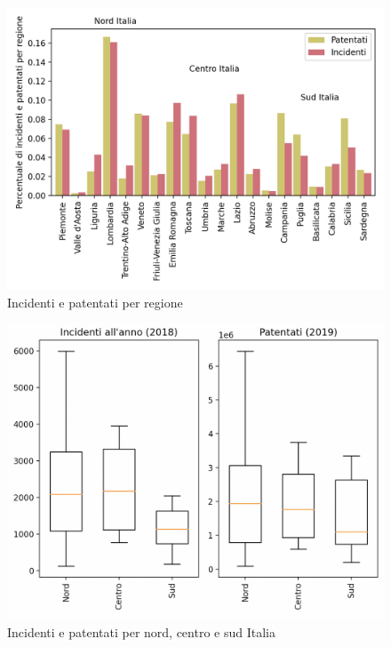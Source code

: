 \documentclass[a4paper]{report}
\begin{document}
\begin{figure}
    \includegraphics[width=\linewidth]{../src/incidenti/incidenti_aci/mappe_regioni/incidenti_patenti_bar.png}
    \caption{Incidenti e patentati per regione}
    \label{fig:incidenti-patentati-bar}
\end{figure}

\begin{figure}
    \includegraphics[width=\linewidth]{../src/incidenti/incidenti_aci/mappe_regioni/incidenti_patenti_box.png}
    \caption{Incidenti e patentati per nord, centro e sud Italia}
    \label{fig:incidenti-patentati-box}
\end{figure}
\end{document}
